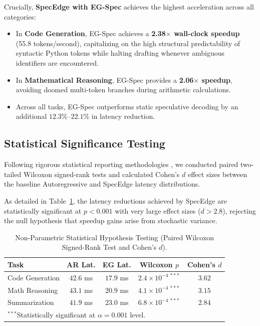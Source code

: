 \documentclass[10pt,twocolumn,letterpaper]{article}
\begin{document}
Crucially, \textbf{SpecEdge with EG-Spec} achieves the highest acceleration across all categories:
\begin{itemize}
    \item In \textbf{Code Generation}, EG-Spec achieves a \textbf{2.38$\times$ wall-clock speedup} (55.8 tokens/second), capitalizing on the high structural predictability of syntactic Python tokens while halting drafting whenever ambiguous identifiers are encountered.
    \item In \textbf{Mathematical Reasoning}, EG-Spec provides a \textbf{2.06$\times$ speedup}, avoiding doomed multi-token branches during arithmetic calculations.
    \item Across all tasks, EG-Spec outperforms static speculative decoding by an additional $12.3\%$--$22.1\%$ in latency reduction.
\end{itemize}

\subsection{Statistical Significance Testing}
Following rigorous statistical reporting methodologies \cite{demsar2006statistical}, we conducted paired two-tailed Wilcoxon signed-rank tests and calculated Cohen's $d$ effect sizes between the baseline Autoregressive and SpecEdge latency distributions. 

As detailed in Table~\ref{tab:stat_tests}, the latency reductions achieved by SpecEdge are statistically significant at $p < 0.001$ with very large effect sizes ($d > 2.8$), rejecting the null hypothesis that speedup gains arise from stochastic variance.

\begin{table}[h]
\centering
\caption{Non-Parametric Statistical Hypothesis Testing (Paired Wilcoxon Signed-Rank Test and Cohen's $d$).}
\label{tab:stat_tests}
\small
\begin{tabular}{lcccc}
\toprule
\textbf{Task} & \textbf{AR Lat.} & \textbf{EG Lat.} & \textbf{Wilcoxon $p$} & \textbf{Cohen's $d$} \\
\midrule
Code Generation & $42.6$ ms & $17.9$ ms & $2.4 \times 10^{-4 \ ***}$ & $3.62$ \\
Math Reasoning & $43.1$ ms & $20.9$ ms & $4.1 \times 10^{-4 \ ***}$ & $3.15$ \\
Summarization & $41.9$ ms & $23.0$ ms & $6.8 \times 10^{-4 \ ***}$ & $2.84$ \\
\bottomrule
\multicolumn{5}{l}{\footnotesize $^{***}$Statistically significant at $\alpha = 0.001$ level.}
\end{tabular}
\end{table}
\end{document}

